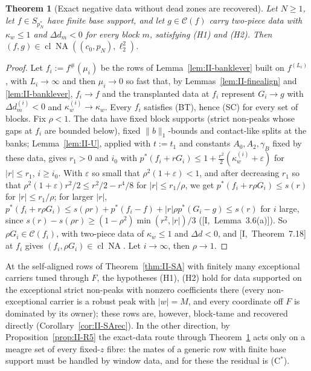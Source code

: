 \documentclass[10pt]{amsart}
\newtheorem{theorem}{Theorem}[section]
\theoremstyle{definition}
\theoremstyle{remark}
\newcommand{\NA}{\operatorname{NA}}
\newcommand{\Cset}{\mathcal C}
\newcommand{\cl}{\operatorname{cl}}
\begin{document}
\begin{theorem}[Exact negative data without dead zones are recovered]\label{thm:II-negexact}
Let $N\ge1$, let $f\in S_{p_N^*}$ have finite base support, and let $g\in\Cset(f)$
carry two-piece data with $\kappa_w\le1$ and $\Delta d_m<0$ for every block $m$,
satisfying \textup{(H1)} and \textup{(H2)}.  Then $(f,g)\in\cl\NA((c_0,p_N),
\ell_2^2)$.
\end{theorem}

\begin{proof}
Let $f_i:=f^\#(\mu_i)$ be the rows of Lemma~\ref{lem:II-banklever} built on
$f^{(L_i)}$, with $L_i\to\infty$ and then $\mu_i\to0$ so fast that, by
Lemmas~\ref{lem:II-finealign} and \ref{lem:II-banklever}, $f_i\to f$ and the
transplanted data at $f_i$ represent $G_i\to g$ with $\Delta d^{(i)}_m<0$ and
$\kappa^{(i)}_w\to\kappa_w$.  Every $f_i$ satisfies (BT), hence (SC) for every
set of blocks.  Fix $\rho<1$.  The data have fixed block supports (strict
non-peaks whose gaps at $f_i$ are bounded below), fixed $\|b\|_1$-bounds and
contact-like splits at the banks; Lemma~\ref{lem:II-U}, applied with $t:=t_1$
and constants $A_0,A_2,\gamma_B$ fixed by these data, gives $r_1>0$ and $i_0$ with
$p^*(f_i+rG_i)\le1+\frac{r^2}2(\kappa^{(i)}_w+\varepsilon)$ for $|r|\le r_1$, $i\ge i_0$.
With $\varepsilon$ so small that $\rho^2(1+\varepsilon)<1$, and after decreasing $r_1$
so that $\rho^2(1+\varepsilon)r^2/2\le r^2/2-r^4/8$ for $|r|\le r_1/\rho$, we get
$p^*(f_i+r\rho G_i)\le s(r)$ for $|r|\le r_1/\rho$; for larger
$|r|$, $p^*(f_i+r\rho G_i)\le s(\rho r)+p^*(f_i-f)+|r|\rho p^*(G_i-g)\le s(r)$ for $i$
large, since $s(r)-s(\rho r)\ge(1-\rho^2)\min(r^2,|r|)/3$ ([I,~Lemma~3.6(a)]).  So
$\rho G_i\in\Cset(f_i)$, with two-piece data of $\kappa_w\le1$ and $\Delta d<0$, and
[I,~Theorem~7.18] at $f_i$ gives $(f_i,\rho G_i)\in\cl\NA$.  Let $i\to\infty$,
then $\rho\to1$.
\end{proof}

At the self-aligned rows of Theorem~\ref{thm:II-SA} with finitely many
exceptional carriers tuned through $F$, the hypotheses (H1), (H2) hold for
data supported on the exceptional strict non-peaks with nonzero coefficients
there (every non-exceptional carrier is a robust peak with $|w|=M$, and every
coordinate off $F$ is dominated by its owner); these rows are, however,
block-tame and recovered directly (Corollary~\ref{cor:II-SArec}).  In the
other direction, by Proposition~\ref{prop:II-R5} the exact-data route through
Theorem~\ref{thm:II-negexact} acts only on a meagre set of every fixed-$z$
fibre: the mates of a generic row with finite base support must be handled by
window data, and for these the residual is (C$^*$).
\end{document}
